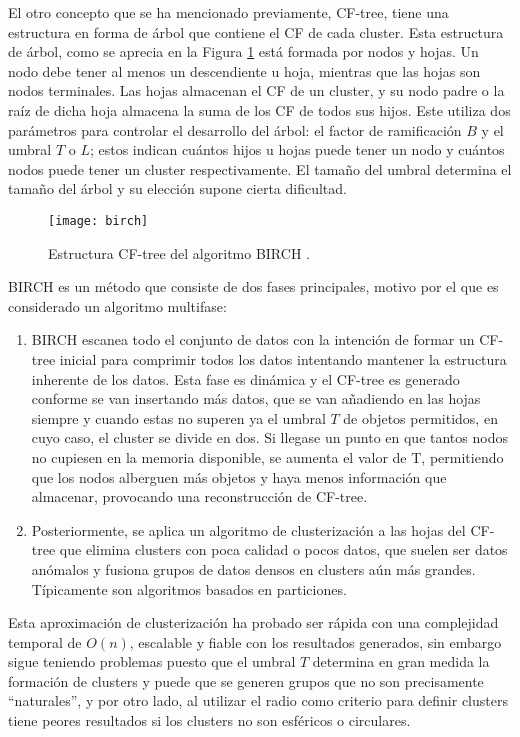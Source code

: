 \documentclass[10pt, a4paper]{article}
\begin{document}
El otro concepto que se ha mencionado previamente, CF-tree, tiene una estructura en forma de árbol que contiene el CF de cada cluster. Esta estructura de árbol, como se aprecia en la Figura \ref{fig:birch} está formada por nodos y hojas. Un nodo debe tener al menos un descendiente u hoja, mientras que las hojas son nodos terminales. Las hojas  almacenan el CF de un cluster, y su nodo padre o la raíz de dicha hoja almacena la suma de los CF de todos sus hijos. Este utiliza dos parámetros para controlar el desarrollo del árbol: el factor de ramificación $B$ y el umbral $T$ o $L$; estos indican cuántos hijos u hojas puede tener un nodo y cuántos nodos puede tener un cluster respectivamente. El tamaño del umbral determina el tamaño del árbol y su elección supone cierta dificultad. 

\begin{figure}[ht]
\centering
\texttt{[image: birch]}
\caption{Estructura CF-tree del algoritmo BIRCH \cite{birchfoto}.}
\label{fig:birch}
\end{figure}

BIRCH es un método que consiste de dos fases principales, motivo por el que es considerado un algoritmo multifase:

\begin{enumerate}
  \item BIRCH escanea todo el conjunto de datos con la intención de formar un CF-tree inicial para comprimir todos los datos intentando mantener la estructura inherente de los datos. Esta fase es dinámica y el CF-tree es generado conforme se van insertando más datos, que se van añadiendo en las hojas siempre y cuando estas no superen ya el umbral $T$ de objetos permitidos, en cuyo caso, el cluster se divide en dos. Si llegase un punto en que tantos nodos no cupiesen en la memoria disponible, se aumenta el valor de T, permitiendo que los nodos alberguen más objetos y haya menos información que almacenar, provocando una reconstrucción de CF-tree.
  \item Posteriormente, se aplica un algoritmo de clusterización a las hojas del CF-tree que elimina clusters con poca calidad o pocos datos, que suelen ser datos anómalos y fusiona grupos de datos densos en clusters aún más grandes. Típicamente son algoritmos basados en particiones.
\end{enumerate}

Esta aproximación de clusterización ha probado ser rápida con una complejidad temporal de $O\left(n \right)$, escalable y fiable con los resultados generados, sin embargo sigue teniendo problemas puesto que el umbral $T$ determina en gran medida la formación de clusters y puede que se generen grupos que no son precisamente ``naturales'', y por otro lado, al utilizar el radio como criterio para definir clusters tiene peores resultados si los clusters no son esféricos o circulares.
\end{document}
